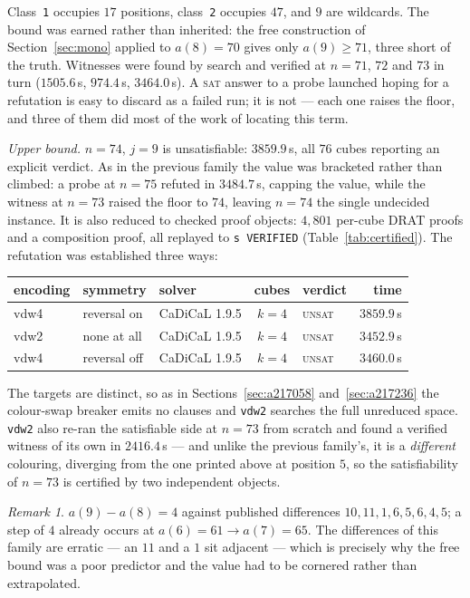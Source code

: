 \documentclass[12pt]{article}
\theoremstyle{remark}
\newtheorem{remark}{Remark}
\begin{document}
\noindent Class~\texttt{1} occupies $17$ positions, class~\texttt{2}
occupies $47$, and $9$ are wildcards. The bound was earned rather than
inherited: the free construction of Section~\ref{sec:mono} applied to
$a(8)=70$ gives only $a(9) \ge 71$, three short of the truth. Witnesses were
found by search and verified at $n=71$, $72$ and $73$ in turn ($1505.6$\,s,
$974.4$\,s, $3464.0$\,s). A \textsc{sat} answer to a probe launched hoping
for a refutation is easy to discard as a failed run; it is not --- each one
raises the floor, and three of them did most of the work of locating this
term.

\emph{Upper bound.} $n=74$, $j=9$ is unsatisfiable: $3859.9$\,s, all $76$
cubes reporting an explicit verdict. As in the previous family the value was
bracketed rather than climbed: a probe at $n=75$ refuted in $3484.7$\,s,
capping the value, while the witness at $n=73$ raised the floor to $74$,
leaving $n=74$ the single undecided instance. It is also reduced to checked
proof objects: $4{,}801$ per-cube DRAT proofs and a composition proof, all
replayed to \texttt{s VERIFIED} (Table~\ref{tab:certified}). The refutation
was established three ways:

\begin{center}
\begin{tabular}{lllclr}
\toprule
encoding & symmetry & solver & cubes & verdict & time \\
\midrule
vdw4 & reversal on & CaDiCaL 1.9.5 & $k=4$ & \textsc{unsat} & $3859.9$\,s \\
vdw2 & none at all & CaDiCaL 1.9.5 & $k=4$ & \textsc{unsat} & $3452.9$\,s \\
vdw4 & reversal off & CaDiCaL 1.9.5 & $k=4$ & \textsc{unsat} & $3460.0$\,s \\
\bottomrule
\end{tabular}
\end{center}

\noindent The targets are distinct, so as in
Sections~\ref{sec:a217058} and~\ref{sec:a217236} the colour-swap breaker
emits no clauses and \texttt{vdw2} searches the full unreduced space.
\texttt{vdw2} also re-ran the satisfiable side at $n=73$ from scratch and
found a verified witness of its own in $2416.4$\,s --- and unlike the
previous family's, it is a \emph{different} colouring, diverging from the
one printed above at position $5$, so the satisfiability of $n=73$ is
certified by two independent objects.

\begin{remark}
$a(9)-a(8)=4$ against published differences $10,11,1,6,5,6,4,5$; a step of
$4$ already occurs at $a(6)=61 \to a(7)=65$. The differences of this family
are erratic --- an $11$ and a $1$ sit adjacent --- which is precisely why
the free bound was a poor predictor and the value had to be cornered rather
than extrapolated.
\end{remark}
\end{document}
